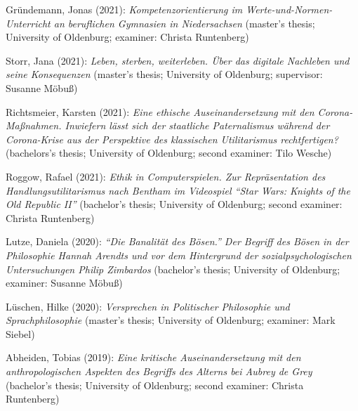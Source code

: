 \documentclass[a4paper,10pt]{article}
\newenvironment{literature}{%
   \parskip6pt\parindent0pt\raggedright
   \def\lititem{\hangindent=1cm\hangafter1}}{%
   \par\ignorespaces}
\begin{document}
\begin{literature}
\lititem Gründemann, Jonas (2021): \textit{Kompetenzorientierung im Werte-und-Normen-Unterricht an beruflichen Gymnasien in Niedersachsen} (master's thesis; University of Oldenburg; examiner: Christa Runtenberg)

\lititem Storr, Jana (2021): \textit{Leben, sterben, weiterleben. Über das digitale Nachleben und seine Konsequenzen} (master's thesis; University of Oldenburg; supervisor: Susanne Möbuß)

\lititem Richtsmeier, Karsten (2021): \textit{Eine ethische Auseinandersetzung mit den Corona-Maßnahmen. Inwiefern lässt sich der staatliche Paternalismus während der Corona-Krise aus der Perspektive des klassischen Utilitarismus rechtfertigen?} (bachelors's thesis; University of Oldenburg; second examiner: Tilo Wesche)

\lititem Roggow, Rafael (2021): \textit{Ethik in Computerspielen. Zur Repräsentation des Handlungsutilitarismus nach Bentham im Videospiel \enquote{Star Wars: Knights of the Old Republic II}} (bachelor's thesis; University of Oldenburg; second examiner: Christa Runtenberg)

\lititem Lutze, Daniela (2020): \textit{\enquote{Die Banalität des Bösen.} Der Begriff des Bösen in der Philosophie Hannah Arendts und vor dem Hintergrund der sozialpsychologischen Untersuchungen Philip Zimbardos} (bachelor's thesis; University of Oldenburg; examiner: Susanne Möbuß)

\lititem Lüschen, Hilke (2020): \textit{Versprechen in Politischer Philosophie und Sprachphilosophie} (master's thesis; University of Oldenburg; examiner: Mark Siebel)

\lititem Abheiden, Tobias (2019): \textit{Eine kritische Auseinandersetzung mit den anthropologischen Aspekten des Begriffs des Alterns bei Aubrey de Grey} (bachelor's thesis; University of Oldenburg; second examiner: Christa Runtenberg)
\end{literature}


\clearpage
\end{document}
